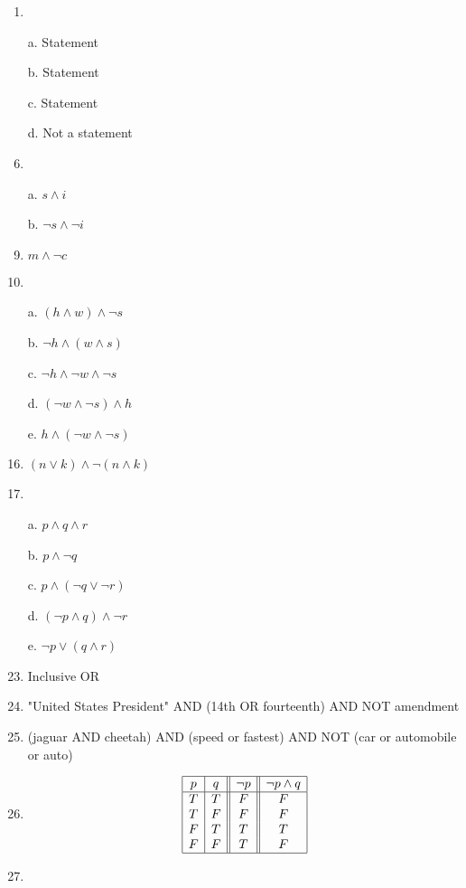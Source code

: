 \documentclass{article}
\begin{document}
\begin{enumerate}[label=\textbf{\arabic*.}]
\item %
\item[a.] Statement
\item[b.] Statement
\item[c.] Statement
\item[d.] Not a statement
\item %
\item[a.] $s \land i$
\item[b.] $\neg s \land \neg i$
\item %
$m \land \neg c$
\item %
\item[a.] $(h \land w) \land \neg s$
\item[b.] $\neg h \land (w \land s)$
\item[c.] $\neg h \land \neg w \land \neg s$
\item[d.] $(\neg w \land \neg s) \land h$
\item[e.] $h \land (\neg w \land \neg s)$
\item %
$(n \lor k) \land \neg (n \land k)$
\item %
\item[a.] $p \land q \land r$
\item[b.] $p \land \neg q$
\item[c.] $p \land (\neg q \lor \neg r)$
\item[d.] $(\neg p \land q) \land \neg r$
\item[e.] $\neg p \lor (q \land r)$
\item %
Inclusive OR
\item %
"United States President" AND (14th OR fourteenth) AND NOT amendment
\item %
(jaguar AND cheetah) AND (speed or fastest) AND NOT (car or automobile or auto)
\item %
\[
\begin{array}{|c|c||c||c|}
\hline
p & q & \neg p & \neg p \land q\\
\hline
T & T & F & F \\
T & F & F & F \\
F & T & T & T \\
F & F & T & F \\
\hline
\end{array}
\]
\item %
\[
\]
\end{enumerate}
\end{document}

